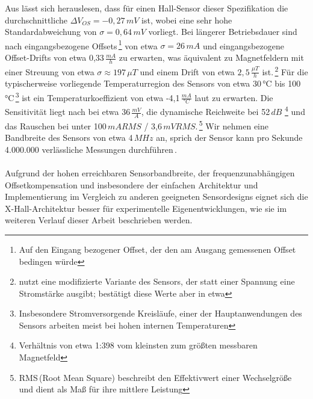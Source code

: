 \documentclass[12pt, a4paper]{article}
\begin{document}
Aus \cite{cres18} lässt sich herauslesen, dass für einen Hall-Sensor dieser Spezifikation die durchschnittliche $\Delta{V_{OS}}=-0,27\,mV$ ist, wobei eine sehr hohe Standardabweichung von $\sigma=0,64\,mV$ vorliegt.\newline
Bei längerer Betriebsdauer sind nach \cite{cres23} eingangsbezogene Offsets\,\footnote{Auf den Eingang bezogener Offset, der den am Ausgang gemessenen Offset bedingen würde} von etwa $\sigma=26\,mA$ und eingangsbezogene Offset-Drifts von etwa 0,33\,$\frac{mA}{h}$ zu erwarten, was äquivalent zu Magnetfeldern mit einer Streuung von etwa $\sigma\approx197\,\mu{T}$ und einem Drift von etwa $2,5\,\frac{\mu{T}}{h}$ ist.\,\footnote{\cite{cres23} nutzt eine modifizierte Variante des Sensors, der statt einer Spannung eine Stromstärke ausgibt; \cite{cres21} bestätigt diese Werte aber in etwa}\newline
Für die typischerweise vorliegende Temperaturregion des Sensors von etwa 30\,°C bis 100\,°C\,\footnote{Insbesondere Stromversorgende Kreisläufe, einer der Hauptanwendungen des Sensors arbeiten meist bei hohen internen Temperaturen} ist ein Temperaturkoeffizient von etwa -4,1\,$\frac{mA}{°C}$ laut \cite{cres23} zu erwarten.\newline
Die Sensitivität liegt nach \cite{cres21Hall} bei etwa 36\,$\frac{mV}{A}$, die dynamische Reichweite bei 52\,$dB$ \footnote{Verhältnis von etwa 1:398 vom kleinsten zum größten messbaren Magnetfeld} und das Rauschen bei unter 100\,$mA RMS$ / 3,6\,$mV RMS$.\,\footnote{RMS\,(Root Mean Square) beschreibt den Effektivwert einer Wechselgröße und dient als Maß für ihre mittlere Leistung}\newline
Wir nehmen eine Bandbreite des Sensors von etwa 4\,$MHz$ an, sprich der Sensor kann pro Sekunde 4.000.000 verlässliche Messungen durchführen\,\cite{cres21}. \paragraph{}

Aufgrund der hohen erreichbaren Sensorbandbreite, der frequenzunabhängigen Offsetkompensation und insbesondere der einfachen Architektur und Implementierung im Vergleich zu anderen geeigneten Sensordesigns eignet sich die X-Hall-Architektur besser für experimentelle Eigenentwicklungen, wie sie im weiteren Verlauf dieser Arbeit beschrieben werden. %
\end{document}
